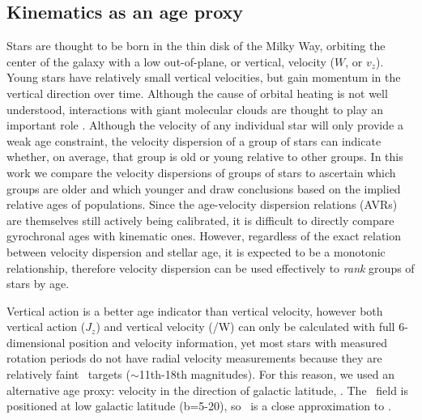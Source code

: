 \subsection{Kinematics as an age proxy}

Stars are thought to be born in the thin disk of the Milky Way, orbiting the
center of the galaxy with a low out-of-plane, or vertical, velocity ($W$, or
$v_z$).
Young stars have relatively small vertical velocities, but gain momentum in
the vertical direction over time.
Although the cause of orbital heating is not well understood, interactions
with giant molecular clouds are thought to play an important role
.
Although the velocity of any individual star will only provide a weak age
constraint, the velocity dispersion of a group of stars can indicate whether,
on average, that group is old or young relative to other groups.
In this work we compare the velocity dispersions of groups of stars to
ascertain which groups are older and which younger and draw conclusions based
on the implied relative ages of populations.
Since the age-velocity dispersion relations (AVRs) are themselves still
actively being calibrated, it is difficult to directly compare gyrochronal
ages with kinematic ones.
However, regardless of the exact relation between velocity dispersion and
stellar age, it is expected to be a monotonic relationship, therefore velocity
dispersion can be used effectively to {\it rank} groups of stars by age.

Vertical action is a better age indicator than vertical velocity, however both
vertical action ($J_z$) and vertical velocity (\vz/W) can only be calculated
with full 6-dimensional position and velocity information, yet most stars with
measured rotation periods do not have radial velocity measurements because
they are relatively faint \kepler\ targets ($\sim$11th-18th magnitudes).
For this reason, we used an alternative age proxy: velocity in the direction
of galactic latitude, \vb.
The \kepler\ field is positioned at low galactic latitude (b=5-20\degrees), so
\vb\ is a close approximation to \vz.

